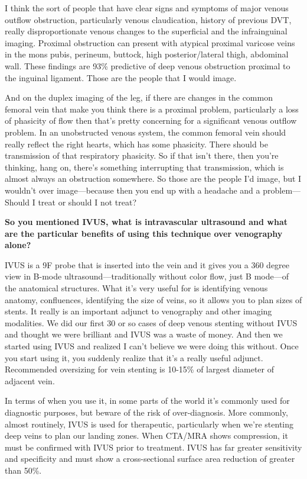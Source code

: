 \documentclass[
]{book}
\begin{document}
I think the sort of people that have clear signs and symptoms of major
venous outflow obstruction, particularly venous claudication, history of
previous DVT, really disproportionate venous changes to the superficial
and the infrainguinal imaging. Proximal obstruction can present with
atypical proximal varicose veins in the mons pubis, perineum, buttock,
high posterior/lateral thigh, abdominal wall. These findings are 93\%
predictive of deep venous obstruction proximal to the inguinal
ligament.\citep{kurstjens2016} Those are the people that I would image.

And on the duplex imaging of the leg, if there are changes in the common
femoral vein that make you think there is a proximal problem,
particularly a loss of phasicity of flow then that's pretty concerning
for a significant venous outflow problem. In an unobstructed venous
system, the common femoral vein should really reflect the right hearts,
which has some phasicity. There should be transmission of that
respiratory phasicity. So if that isn't there, then you're thinking,
hang on, there's something interrupting that transmission, which is
almost always an obstruction somewhere. So those are the people I'd
image, but I wouldn't over image---because then you end up with a
headache and a problem---Should I treat or should I not treat?

\textbf{So you mentioned IVUS, what is intravascular ultrasound and what are
the particular benefits of using this technique over venography alone?}

IVUS is a 9F probe that is inserted into the vein and it gives you a 360
degree view in B-mode ultrasound---traditionally without color flow,
just B mode---of the anatomical structures. What it's very useful for is
identifying venous anatomy, confluences, identifying the size of veins,
so it allows you to plan sizes of stents. It really is an important
adjunct to venography and other imaging modalities. We did our first 30
or so cases of deep venous stenting without IVUS and thought we were
brilliant and IVUS was a waste of money. And then we started using IVUS
and realized I can't believe we were doing this without. Once you start
using it, you suddenly realize that it's a really useful adjunct.
Recommended oversizing for vein stenting is 10-15\% of largest diameter
of adjacent vein.\citep{gloviczki2011, odonnell2014, raju2002, raju2010}

In terms of when you use it, in some parts of the world it's commonly
used for diagnostic purposes, but beware of the risk of over-diagnosis.
More commonly, almost routinely, IVUS is used for therapeutic,
particularly when we're stenting deep veins to plan our landing zones.
When CTA/MRA shows compression, it must be confirmed with IVUS prior to
treatment. IVUS has far greater sensitivity and specificity and must
show a cross-sectional surface area reduction of greater than
50\%.\citep{gagne2018, forauer2002}
\end{document}

